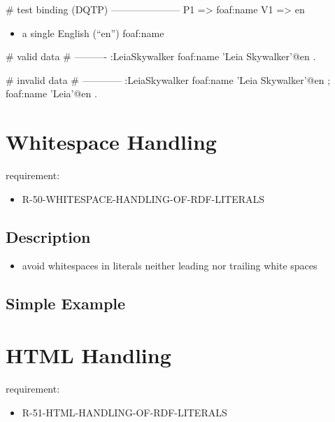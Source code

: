 \documentclass{llncs}
\begin{document}
\begin{ex}
# test binding (DQTP)
---------------------
P1 => foaf:name
V1 => en
\end{ex}

\begin{itemize}
	\item a single English (“en”) foaf:name
\end{itemize}

\begin{ex}
# valid data
# ----------
:LeiaSkywalker
    foaf:name 'Leia Skywalker'@en .
\end{ex}

\begin{ex}
# invalid data
# ------------
:LeiaSkywalker
    foaf:name 'Leia Skywalker'@en ;
    foaf:name 'Leia'@en .
\end{ex}

\section{Whitespace Handling}

requirement:

\begin{itemize}
	\item R-50-WHITESPACE-HANDLING-OF-RDF-LITERALS
\end{itemize}

\subsection{Description}

\begin{itemize}
	\item avoid whitespaces in literals neither leading nor trailing white spaces
\end{itemize}

\subsection{Simple Example}

\section{HTML Handling}

requirement:

\begin{itemize}
	\item R-51-HTML-HANDLING-OF-RDF-LITERALS
\end{itemize}
\end{document}
